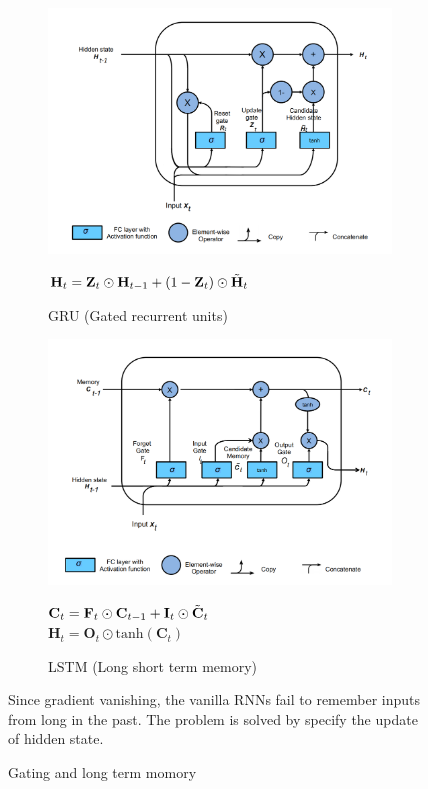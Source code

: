 \begin{figure}[htpb]
    \centering
    \begin{subfigure}[t]{0.45\textwidth}
    \centering
    \label{fig:gru}
    \includegraphics[width=\textwidth]{figs/gru.png}
    \caption{GRU (Gated recurrent units)}
    {\footnotesize
    $\mathbf{H}_t
    = \mathbf{Z}_t\odot\mathbf{H}_{t-1}
    + (1-\mathbf{Z}_t)\odot\Tilde{\mathbf{H}}_t$
    }
    \end{subfigure}
    \begin{subfigure}[t]{0.45\textwidth}
    \centering
    \label{fig:lstm}
    \includegraphics[width=\textwidth]{figs/lstm.png}
    \caption{LSTM (Long short term memory)}
    {\footnotesize
    $\mathbf{C}_t=\mathbf{F}_t\odot\mathbf{C}_{t-1}+\mathbf{I}_t\odot\Tilde{\mathbf{C}}_t$\\
    $\mathbf{H}_t=\mathbf{O}_t\odot\mathrm{tanh}(\mathbf{C}_t)$
    }
    \end{subfigure}
    \caption{Gating and long term momory}
    {\footnotesize
    Since gradient vanishing, the vanilla RNNs fail to remember inputs from long in the past.
    The problem is solved by specify the update of hidden state.
    }
    \label{fig:grulstm}
\end{figure}



